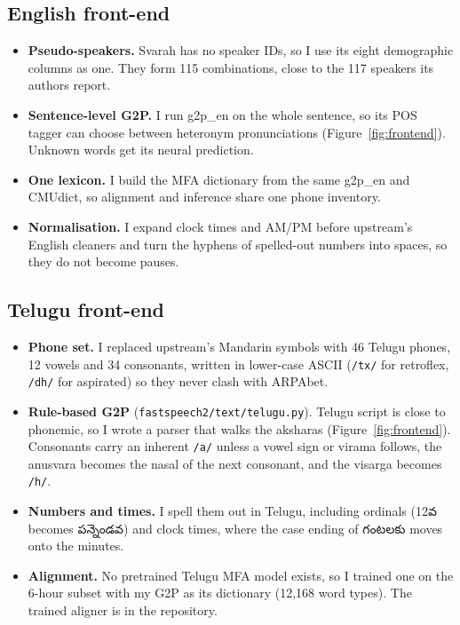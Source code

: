 \documentclass[11pt,a4paper]{article}
\newcommand{\te}[1]{{\telugufont #1}}
\newcommand{\code}[1]{\texttt{#1}}
\newcommand{\ph}[1]{\texttt{/#1/}}
\begin{document}
\subsection{English front-end}
\begin{itemize}
\item \textbf{Pseudo-speakers.} Svarah has no speaker IDs, so I use its eight demographic columns as one. They
  form 115 combinations, close to the 117 speakers its authors report.
\item \textbf{Sentence-level G2P.} I run g2p\_en on the whole sentence, so its POS tagger can choose between
  heteronym pronunciations (Figure~\ref{fig:frontend}). Unknown words get its neural prediction.
\item \textbf{One lexicon.} I build the MFA dictionary from the same g2p\_en and CMUdict, so alignment and
  inference share one phone inventory.
\item \textbf{Normalisation.} I expand clock times and AM/PM before upstream's English cleaners and turn the
  hyphens of spelled-out numbers into spaces, so they do not become pauses.
\end{itemize}

\subsection{Telugu front-end}
\begin{itemize}
\item \textbf{Phone set.} I replaced upstream's Mandarin symbols with 46 Telugu phones, 12 vowels and 34
  consonants, written in lower-case ASCII (\ph{tx} for retroflex, \ph{dh} for aspirated) so they never clash with
  ARPAbet.
\item \textbf{Rule-based G2P} (\code{fastspeech2/text/telugu.py}). Telugu script is close to phonemic, so I wrote
  a parser that walks the aksharas (Figure~\ref{fig:frontend}). Consonants carry an inherent \ph{a} unless a vowel
  sign or virama follows, the anusvara becomes the nasal of the next consonant, and the visarga becomes \ph{h}.
\item \textbf{Numbers and times.} I spell them out in Telugu, including ordinals (\te{12వ} becomes
  \te{పన్నెండవ}) and clock times, where the case ending of \te{గంటలకు} moves onto the minutes.
\item \textbf{Alignment.} No pretrained Telugu MFA model exists, so I trained one on the 6-hour subset with my G2P
  as its dictionary (12{,}168 word types). The trained aligner is in the repository.
\end{itemize}
\end{document}

